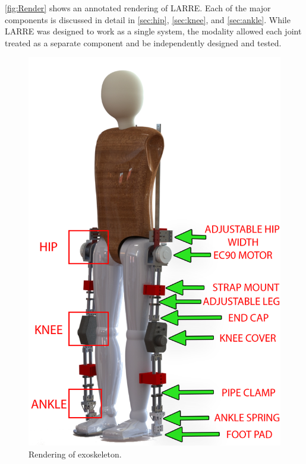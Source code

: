  \autoref{fig:Render} shows an annotated rendering of LARRE.  Each of the major components is discussed in detail in  \autoref{sec:hip}, \autoref{sec:knee}, and \autoref{sec:ankle}. While LARRE was designed to work as a single system, the modality allowed each joint treated as a separate component and be independently designed and tested. 

\begin{figure}[h!]
    \centering
    \includegraphics[scale=0.25]{images/mech_design/rendering2.png}
    \caption{Rendering of exoskeleton.}
    \label{fig:Render}
\end{figure}

